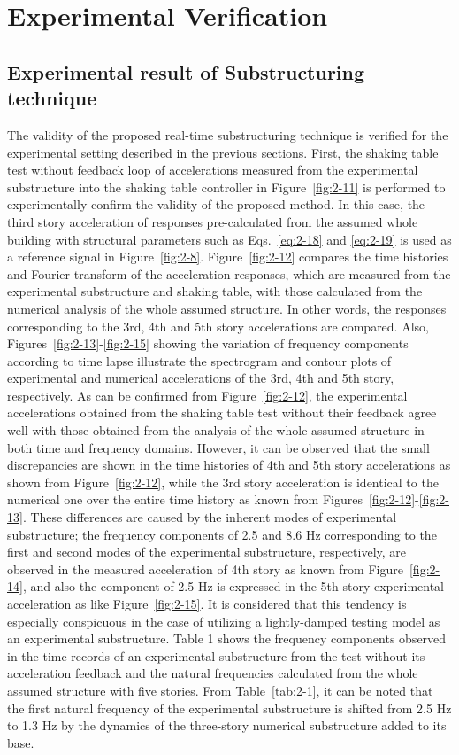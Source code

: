 \section{Experimental Verification}
\subsection{Experimental result of Substructuring technique}

The validity of the proposed real-time substructuring technique is verified for the experimental setting described in the previous sections. First, the shaking table test without feedback loop of accelerations measured from the experimental substructure into the shaking table controller in Figure~\ref{fig:2-11} is performed to experimentally confirm the validity of the proposed method. In this case, the third story acceleration of responses pre-calculated from the assumed whole building with structural parameters such as Eqs.~\eqref{eq:2-18} and \eqref{eq:2-19} is used as a reference signal in Figure~\ref{fig:2-8}. Figure~\ref{fig:2-12} compares the time histories and Fourier transform of the acceleration responses, which are measured from the experimental substructure and shaking table, with those calculated from the numerical analysis of the whole assumed structure. In other words, the responses corresponding to the 3rd, 4th and 5th story accelerations are compared. Also, Figures~\ref{fig:2-13}-\ref{fig:2-15} showing the variation of frequency components according to time lapse illustrate the spectrogram and contour plots of experimental and numerical accelerations of the 3rd, 4th and 5th story, respectively. As can be confirmed from Figure~\ref{fig:2-12}, the experimental accelerations obtained from the shaking table test without their feedback agree well with those obtained from the analysis of the whole assumed structure in both time and frequency domains. However, it can be observed that the small discrepancies are shown in the time histories of 4th and 5th story accelerations as shown from Figure~\ref{fig:2-12}, while the 3rd story acceleration is identical to the numerical one over the entire time history as known from Figures~\ref{fig:2-12}-\ref{fig:2-13}. These differences are caused by the inherent modes of experimental substructure; the frequency components of 2.5 and 8.6 Hz corresponding to the first and second modes of the experimental substructure, respectively, are observed in the measured acceleration of 4th story as known from Figure~\ref{fig:2-14}, and also the component of 2.5 Hz is expressed in the 5th story experimental acceleration as like Figure~\ref{fig:2-15}. It is considered that this tendency is especially conspicuous in the case of utilizing a lightly-damped testing model as an experimental substructure. Table 1 shows the frequency components observed in the time records of an experimental substructure from the test without its acceleration feedback and the natural frequencies calculated from the whole assumed structure with five stories. From Table~\ref{tab:2-1}, it can be noted that the first natural frequency of the experimental substructure is shifted from 2.5 Hz to 1.3 Hz by the dynamics of the three-story numerical substructure added to its base.
